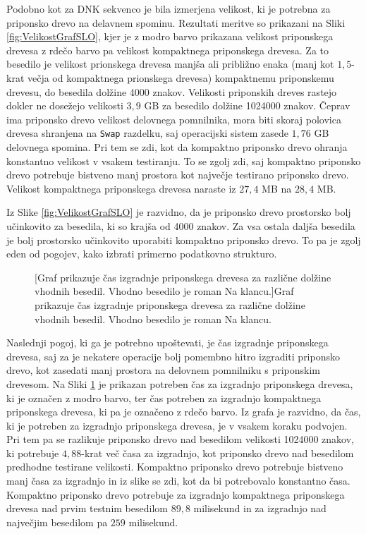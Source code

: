Podobno kot za DNK sekvenco je bila izmerjena velikost, ki je potrebna za priponsko drevo na delavnem spominu. Rezultati meritve so prikazani na Sliki \ref{fig:VelikostGrafSLO}, kjer je z modro barvo prikazana velikost priponskega drevesa z rdečo barvo pa velikost kompaktnega priponskega drevesa. Za to besedilo je velikost prionskega drevesa manjša ali približno enaka (manj kot $1,5$-krat večja od kompaktnega prionskega drevesa) kompaktnemu priponskemu drevesu, do besedila dolžine 4000 znakov. Velikosti priponskih dreves rastejo dokler ne dosežejo velikosti $3,9$ GB za besedilo dolžine 1024000 znakov. Čeprav ima priponsko drevo velikost delovnega pomnilnika, mora biti skoraj polovica drevesa shranjena na \verb|Swap| razdelku, saj operacijski sistem zasede $1,76$ GB delovnega spomina. Pri tem se zdi, kot da kompaktno priponsko drevo ohranja konstantno velikost v vsakem testiranju. To se zgolj zdi, saj kompaktno priponsko drevo potrebuje bistveno manj prostora kot največje testirano priponsko drevo. Velikost kompaktnega priponskega drevesa naraste iz $27,4$ MB na $28,4$ MB.

Iz Slike \ref{fig:VelikostGrafSLO} je razvidno, da je priponsko drevo prostorsko bolj učinkovito za besedila, ki so krajša od 4000 znakov. Za vsa ostala daljša besedila je bolj prostorsko učinkovito uporabiti kompaktno priponsko drevo. To pa je zgolj eden od pogojev, kako izbrati primerno podatkovno strukturo.


\begin{figure}[htb]
    
    [Graf prikazuje čas izgradnje priponskega drevesa za različne dolžine vhodnih besedil. Vhodno besedilo je roman Na klancu.]{Graf prikazuje čas izgradnje priponskega drevesa za različne dolžine vhodnih besedil. Vhodno besedilo je roman Na klancu.} 
    \label{fig:IzgradnjaGrafSLO}
\end{figure}

Naslednji pogoj, ki ga je potrebno upoštevati, je čas izgradnje priponskega drevesa, saj za je nekatere operacije bolj pomembno hitro izgraditi priponsko drevo, kot zasedati manj prostora na delovnem pomnilniku s priponskim drevesom. Na Sliki \ref{fig:IzgradnjaGrafSLO} je prikazan potreben čas za izgradnjo priponskega drevesa, ki je označen z modro barvo, ter čas potreben za izgradnjo kompaktnega priponskega drevesa, ki pa je označeno z rdečo barvo. Iz grafa je razvidno, da čas, ki je potreben za izgradnjo priponskega drevesa, je v vsakem koraku podvojen. Pri tem pa se razlikuje priponsko drevo nad besedilom velikosti 1024000 znakov, ki potrebuje $4,88$-krat več časa za izgradnjo, kot priponsko drevo nad besedilom predhodne testirane velikosti. Kompaktno priponsko drevo potrebuje bistveno manj časa za izgradnjo in iz slike se zdi, kot da bi potrebovalo konstantno časa. Kompaktno priponsko drevo potrebuje za izgradnjo kompaktnega priponskega drevesa nad prvim testnim besedilom $89,8$ milisekund in za izgradnjo nad največjim besedilom pa $259$ milisekund.

